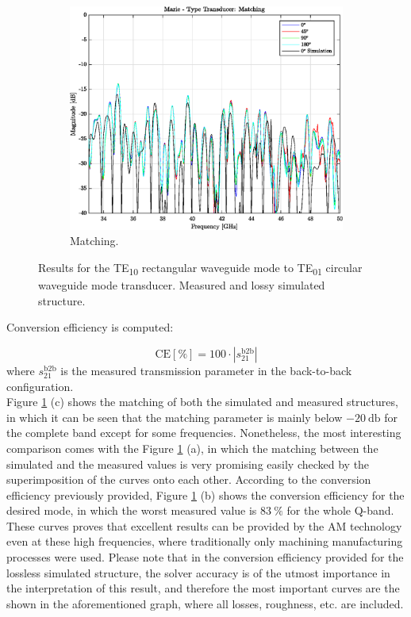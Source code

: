 \documentclass[english,twoside]{article}
\begin{document}
\begin{figure}
		\begin{subfigure}[b]{0.48\textwidth}
			\includegraphics[width=\textwidth]{figures/marie_measured_matching}
			\caption{Matching.}
		\end{subfigure}
		\caption{Results for the TE\textsubscript{10} rectangular waveguide mode to TE\textsubscript{01} circular waveguide mode transducer. Measured and lossy simulated structure.}
		\label{fig:marie_measured}
	\end{figure}

	Conversion efficiency is computed:
	
	\begin{equation}
		\textrm{CE}[\%]=100\cdot |s_{21}^{\textrm{b2b}}|
	\end{equation}	
	where $s_{21}^{\textrm{b2b}}$ is the measured transmission parameter in the back-to-back configuration.\\    
	
	Figure \ref{fig:marie_measured} (c) shows the matching of both the simulated and measured structures, in which it can be seen that the matching parameter is mainly below $\SI{-20}{\decibel}$ for the complete band except for some frequencies. Nonetheless, the most interesting comparison comes with the Figure \ref{fig:marie_measured} (a), in which the matching between the simulated and the measured values is very promising easily checked by the superimposition of the curves onto each other. According to the conversion efficiency previously provided, Figure \ref{fig:marie_measured} (b) shows the conversion efficiency for the desired mode, in which the worst measured value is $\SI{83}{\percent}$ for the whole Q-band. These curves proves that excellent results can be provided by the \ac{AM} technology even at these high frequencies, where traditionally only machining manufacturing processes were used. Please note that in the conversion efficiency provided for the lossless simulated structure, the solver accuracy is of the utmost importance in the interpretation of this result, and therefore the most important curves are the shown in the aforementioned graph, where all losses, roughness, etc. are included.\\
	
\end{document}
